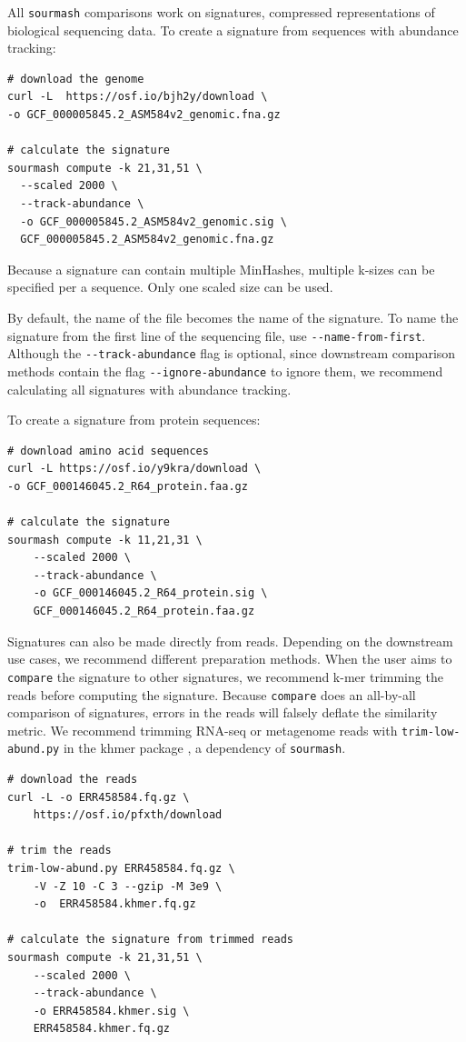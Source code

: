 \documentclass[10pt,a4paper,twocolumn]{article}
\begin{document}
All \lstinline{sourmash} comparisons work on signatures, compressed representations of biological sequencing data. To create a signature from sequences with abundance tracking:

\begin{lstlisting}
# download the genome
curl -L  https://osf.io/bjh2y/download \
-o GCF_000005845.2_ASM584v2_genomic.fna.gz

# calculate the signature
sourmash compute -k 21,31,51 \ 
  --scaled 2000 \ 
  --track-abundance \ 
  -o GCF_000005845.2_ASM584v2_genomic.sig \
  GCF_000005845.2_ASM584v2_genomic.fna.gz
\end{lstlisting}

Because a signature can contain multiple MinHashes, multiple k-sizes can be specified per a sequence. Only one scaled size can be used. 

By default, the name of the file becomes the name of the signature. To name the signature from the first line of the sequencing file, use \lstinline{--name-from-first}. Although the \lstinline{--track-abundance} flag is optional, since downstream comparison methods contain the flag \lstinline{--ignore-abundance} to ignore them, we recommend calculating all signatures with abundance tracking. 

\smallskip

To create a signature from protein sequences:

\begin{lstlisting}
# download amino acid sequences
curl -L https://osf.io/y9kra/download \ 
-o GCF_000146045.2_R64_protein.faa.gz

# calculate the signature
sourmash compute -k 11,21,31 \
    --scaled 2000 \
    --track-abundance \
    -o GCF_000146045.2_R64_protein.sig \ 
    GCF_000146045.2_R64_protein.faa.gz
\end{lstlisting}

Signatures can also be made directly from reads. Depending on the downstream use cases, we recommend different preparation methods. When the user aims to \lstinline{compare} the signature to other signatures, we recommend k-mer trimming the reads before computing the signature. Because \lstinline{compare} does an all-by-all comparison of signatures, errors in the reads will falsely deflate the similarity metric. We recommend trimming RNA-seq or metagenome reads with \lstinline{trim-low-abund.py} in the khmer package \cite{crusoe2015khmer}, a dependency of \lstinline{sourmash}. 

\begin{lstlisting}
# download the reads
curl -L -o ERR458584.fq.gz \ 
    https://osf.io/pfxth/download

# trim the reads
trim-low-abund.py ERR458584.fq.gz \ 
    -V -Z 10 -C 3 --gzip -M 3e9 \ 
    -o  ERR458584.khmer.fq.gz 

# calculate the signature from trimmed reads
sourmash compute -k 21,31,51 \ 
    --scaled 2000 \ 
    --track-abundance \ 
    -o ERR458584.khmer.sig \ 
    ERR458584.khmer.fq.gz
\end{lstlisting}
\end{document}
